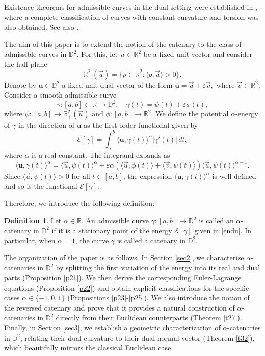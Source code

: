\documentclass[a4paper,12pt]{amsart}
\theoremstyle{definition}
\newtheorem{definition}[theorem]{Definition}
\def\r{\mathbb R}
\def\d{\mathsf d}
\def\d{\mathbb D}
\begin{document}
Existence theorems for admissible curves in the dual setting were established in \cite{lo}, where a complete classification of curves with constant curvature and torsion was also obtained. See also \cite{ace}.

The aim of this paper is to extend the notion of the catenary to the class of admissible curves in
$\d^2$. For this, let $\vec{u}\in \r^2$ be a fixed unit vector and consider the half-plane 
$$\r^2_+(\vec{u})=\{p\in \r^2:\langle p,\vec{u}\rangle >0 \}.$$
Denote by $\mathbf{u}\in \d^2$ a fixed unit dual vector of the form $\mathbf{u}=\vec{u}+\varepsilon\vec{v},$  where $\vec{v}\in \r^2$. Consider a smooth admissible curve 
 $$\gamma:[a,b]\subset\r\to \d^2,\quad  \gamma(t)=\psi(t)+\varepsilon \phi (t),$$
where  $\psi:[a,b]\to \r^2_+(\vec{u})$ and $\phi:[a,b]\to \r^2$. We define the potential $\alpha$-energy of $\gamma$ in the direction of $\mathbf{u}$ as the first-order functional given by
\begin{equation}\label{endu}
\mathcal{E}[\gamma]=\int_a^b \langle \mathbf{u},\gamma(t)\rangle^\alpha |\gamma'(t)|\, dt,
\end{equation}
where $\alpha$ is a real constant. The integrand expands as
\begin{equation}\label{endu2}
\langle \mathbf{u},\gamma(t)\rangle^\alpha=\langle\vec{u},\psi(t)\rangle^\alpha +\varepsilon\alpha(\langle \vec{u},\phi(t)\rangle+\langle \vec{v},\psi(t)\rangle)\langle\vec{u},\psi(t)\rangle^{\alpha-1} .
\end{equation}
Since $\langle\vec{u},\psi(t)\rangle>0$ for all $t\in [a,b]$, the expression $\langle \mathbf{u},\gamma(t)\rangle^\alpha$ is well defined and so is the functional $\mathcal{E}[\gamma]$.

Therefore, we introduce the following definition:

\begin{definition}
Let $\alpha\in \r$. An admissible curve $\gamma:[a,b]\to\d^2$ is called an $\alpha$-catenary in $\d^2$ if it is a stationary point of the energy $\mathcal{E}[\gamma]$ given in \eqref{endu}. In particular, when $\alpha=1$, the curve $\gamma$ is called a catenary in $\d^2$.
\end{definition}

The organization of the paper is as follows. In Section \ref{sec2}, we characterize $\alpha$-catenaries in $\d^2$ by splitting the first variation of the energy into its real and dual parts (Proposition \ref{p21}). We then derive the corresponding Euler-Lagrange equations (Proposition \ref{p22}) and obtain explicit classifications for the specific cases $\alpha \in \{-1, 0, 1\}$ (Propositions \ref{p23}-\ref{p25}). We also introduce the notion of the reversed catenary and prove that it provides a natural construction of $\alpha$-catenaries in $\d^2$ directly from their Euclidean counterparts (Theorem \ref{t27}). Finally, in Section \ref{sec3}, we establish a geometric characterization of $\alpha$-catenaries in $\d^2$, relating their dual curvature to their dual normal vector (Theorem \ref{t32}), which beautifully mirrors the classical Euclidean case. 
\end{document}
